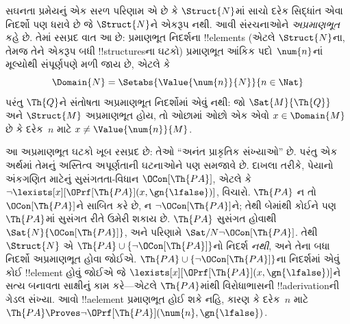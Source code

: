 \documentclass[../../../include/open-logic-section]{subfiles}
\begin{document}
સઘનતા પ્રમેયનું એક સરળ પરિણામ એ છે કે $\Struct{N}$માં સાચો દરેક
સિદ્ધાંત એવા નિદર્શો પણ ધરાવે છે જે $\Struct{N}$ને એકરૂપ નથી. આવી
સંરચનાઓને \emph{અપ્રમાણભૂત} કહે છે. તેમાં રસપ્રદ વાત આ છે: પ્રમાણભૂત
નિદર્શના !!{element}s (એટલે $\Struct{N}$ના, તેમજ તેને એકરૂપ બધી
!!{structure}sના ઘટકો) પ્રમાણભૂત આંકિક પદો~$\num{n}$નાં મૂલ્યોથી
સંપૂર્ણપણે મળી જાય છે, એટલે કે
\[
\Domain{N} = \Setabs{\Value{\num{n}}{N}}{n \in \Nat}
\]
પરંતુ $\Th{Q}$ને સંતોષતા અપ્રમાણભૂત નિદર્શોમાં એવું નથી: જો
$\Sat{M}{\Th{Q}}$ અને $\Struct{M}$ અપ્રમાણભૂત હોય,
તો ઓછામાં ઓછો એક એવો $x\in\Domain{M}$ છે કે દરેક~$n$ માટે
$x\neq\Value{\num{n}}{M}$.

આ અપ્રમાણભૂત ઘટકો ખૂબ રસપ્રદ છે: તેઓ ``અનંત પ્રાકૃતિક સંખ્યાઓ'' છે.
પરંતુ એક અર્થમાં તેમનું અસ્તિત્વ અપૂર્ણતાની ઘટનાઓને પણ સમજાવે છે.
દાખલા તરીકે, પેયાનો અંકગણિત માટેનું સુસંગતતા-વિધાન
$\OCon[\Th{PA}]$, એટલે કે
$\lnot\lexists[x][\OPrf[\Th{PA}](x,\gn{\lfalse})]$, વિચારો.
$\Th{PA}$ ન તો $\OCon[\Th{PA}]$ને સાબિત કરે છે, ન
$\lnot\OCon[\Th{PA}]$ને; તેથી
બેમાંથી કોઈને પણ $\Th{PA}$માં સુસંગત રીતે ઉમેરી શકાય છે. $\Th{PA}$
સુસંગત હોવાથી $\Sat{N}{\OCon[\Th{PA}]}$, અને પરિણામે
$\Sat/{N}{\lnot\OCon[\Th{PA}]}$. તેથી $\Struct{N}$ એ
$\Th{PA}\cup\{\lnot\OCon[\Th{PA}]\}$નો નિદર્શ \emph{નથી}, અને તેના
બધા નિદર્શો અપ્રમાણભૂત હોવા જોઈએ.
$\Th{PA}\cup\{\lnot\OCon[\Th{PA}]\}$ના નિદર્શમાં એવું કોઈ
!!{element} હોવું જોઈએ જે
$\lexists[x][\OPrf[\Th{PA}](x,\gn{\lfalse})]$ને સત્ય બનાવતા સાક્ષીનું
કામ કરે—એટલે $\Th{PA}$માંથી વિરોધાભાસની !!a{derivation}ની ગેડલ સંખ્યા.
આવો !!a{element} પ્રમાણભૂત હોઈ શકે નહિ, કારણ કે દરેક~$n$ માટે
$\Th{PA}\Proves\lnot\OPrf[\Th{PA}](\num{n},\gn{\lfalse})$.
\end{document}
